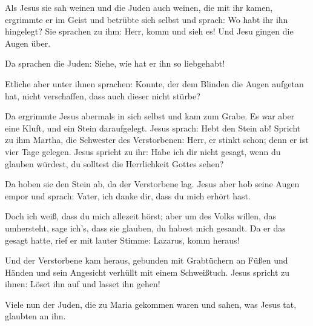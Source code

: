  Als Jesus sie sah weinen und die Juden auch weinen, die
mit ihr kamen, ergrimmte er im Geist und betrübte sich selbst
 und sprach: Wo habt ihr ihn hingelegt? Sie sprachen zu
ihm: Herr, komm und sieh es!  Und Jesu gingen die Augen
über.

 Da sprachen die Juden: Siehe, wie hat er ihn so
liebgehabt!

 Etliche aber unter ihnen sprachen: Konnte, der dem
Blinden die Augen aufgetan hat, nicht verschaffen, dass auch dieser
nicht stürbe?

 Da ergrimmte Jesus abermals in sich selbst und kam zum
Grabe. Es war aber eine Kluft, und ein Stein daraufgelegt.
 Jesus sprach: Hebt den Stein ab! Spricht zu ihm Martha,
die Schwester des Verstorbenen: Herr, er stinkt schon; denn er ist vier
Tage gelegen.  Jesus spricht zu ihr: Habe ich dir nicht
gesagt, wenn du glauben würdest, du solltest die Herrlichkeit Gottes
sehen?

 Da hoben sie den Stein ab, da der Verstorbene lag. Jesus
aber hob seine Augen empor und sprach: Vater, ich danke dir, dass du
mich erhört hast.

 Doch ich weiß, dass du mich allezeit hörst; aber um des
Volks willen, das umhersteht, sage ich's, dass sie glauben, du habest
mich gesandt.  Da er das gesagt hatte, rief er mit lauter
Stimme: Lazarus, komm heraus!

 Und der Verstorbene kam heraus, gebunden mit Grabtüchern
an Füßen und Händen und sein Angesicht verhüllt mit einem Schweißtuch.
Jesus spricht zu ihnen: Löset ihn auf und lasset ihn gehen!

 Viele nun der Juden, die zu Maria gekommen waren und
sahen, was Jesus tat, glaubten an ihn.

